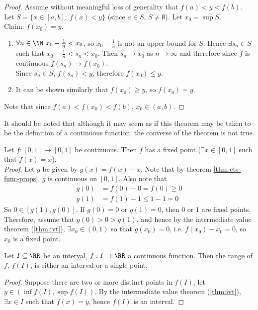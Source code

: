 \documentclass[../real_analysis.tex]{subfiles}
\begin{document}
            \begin{proof}
                Assume without meaningful loss of generality that $f(a)<y<f(b)$. Let $S=\{x\in[a,b]:\ f(x)<y\}$ (since $a\in S$, $S\neq\emptyset$). Let $x_0=\sup S$.\\
                Claim: $f(x_0)=y$.
                \begin{enumerate}[label={\upshape(\roman*)}]
                    \item $\forall n\in\NN\ x_0-\frac{1}{n}<x_0$, so $x_0-\frac{1}{n}$ is not an upper bound for $S$. Hence $\exists s_n\in S$ such that $x_0-\frac{1}{n}<s_n<x_0$. Then $s_n\to x_0$ as $n\to\infty$ and therefore since $f$ is continuous $f(s_n)\to f(x_0)$.\\
                    Since $s_n\in S$, $f(s_n)<y$, therefore $f(x_0)\leq y$.
                    \item It can be shown similarly that $f(x_0)\geq y$, so $f(x_0)=y$.
                \end{enumerate}
                Note that since $f(a)<f(x_0)<f(b)$, $x_0\in(a,b)$.
            \end{proof}
            It should be noted that although it may seem as if this theorem may be taken to be the definition of a continuous function, the converse of the theorem is not true.
            \begin{example}
                Let $f:[0,1]\to[0,1]$ be continuous. Then $f$ has a fixed point ($\exists x\in[0,1]$ such that $f(x)=x$).\\
                \textit{Proof}. Let $g$ be given by $g(x)=f(x)-x$. Note that by theorem \ref{thm:cts-func-props}, $g$ is continuous on $[0,1]$. Also note that
                \begin{align}
                    g(0)&=f(0)-0=f(0)\geq0\\
                    g(1)&=f(1)-1\leq1-1=0
                \end{align}
                So $0\in[g(1),g(0)]$. If $g(0)=0$ or $g(1)=0$, then $0$ or $1$ are fixed points. Therefore, assume that $g(0)>0>g(1)$, and hence by the intermediate value theorem (\ref{thm:ivt}), $\exists x_0\in(0,1)$ so that $g(x_0)=0$, i.e. $f(x_0)-x_0=0$, so $x_0$ is a fixed point.
            \end{example}
            \begin{corollary}
                Let $I\subseteq\RR$ be an interval, $f: I\to\RR$ a continuous function. Then the range of $f$, $f(I)$, is either an interval or a single point.
            \end{corollary}
            \begin{proof}
                Suppose there are two or more distinct points in $f(I)$, let $y\in(\inf f(I),\sup f(I))$. By the intermediate value theorem (\ref{thm:ivt}), $\exists x\in I$ such that $f(x)=y$, hence $f(I)$ is an interval.
            \end{proof}
\end{document}
